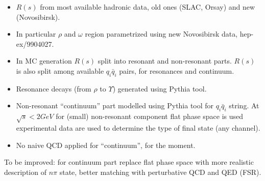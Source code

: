 \documentclass[dvips]{seminar}                      %
\begin{document}
\begin{slide}
{\cbl
  \begin{itemize}
  \item
    $R(s)$ from most available hadronic data, old ones (SLAC, Orsay)
    and new (Novosibirsk).
  \item
    In particular $\rho$ and $\omega$ region parametrized using new Novosibirsk data,
    hep-ex/9904027.
  \item
    In MC generation $R(s)$ split into resonant and non-resonant parts.
    $R(s)$ is also split among available  $q_i\bar{q}_i$ pairs, for resonances and continuum.
  \item
    Resonance decays (from $\rho$ to $\Upsilon$) generated using Pythia tool.
  \item
    Non-resonant  ``continuum'' part modelled using Pythia tool for $q_i\bar{q}_i$ string.
    At $\sqrt{s}<2GeV$ for (small) non-resonant component flat phase space is used
    experimental data are used to determine the type of final state (any channel).
  \item
    No naive QCD applied for ``continuum'', for the moment.
  \end{itemize}
}
To be improved: for continuum part replace flat phase space
with more realistic description of $n\pi$ state,
better matching with perturbative QCD and QED (FSR).

\vfill
\end{slide}    %



\begin{slide}
\vspace{-3mm}

\vfill
\end{slide}    %
\end{document}
